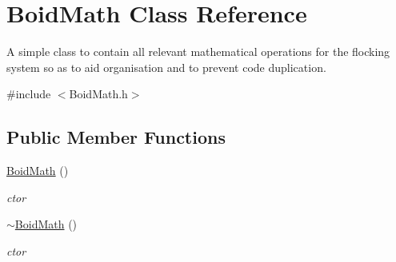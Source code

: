 \hypertarget{classBoidMath}{
\section{BoidMath Class Reference}
\label{classBoidMath}
}


A simple class to contain all relevant mathematical operations for the flocking system so as to aid organisation and to prevent code duplication.  


{\ttfamily \#include $<$BoidMath.h$>$}\subsection*{Public Member Functions}
\begin{DoxyCompactItemize}
\item 
\hyperlink{classBoidMath_a96f701b19a18f2a07372f5eb50548e99}{BoidMath} ()
\begin{DoxyCompactList}\small\item\em ctor \item\end{DoxyCompactList}\item 
\hyperlink{classBoidMath_a1b7dfa1c968c08d4ed9ba03be75d91e0}{$\sim$BoidMath} ()
\begin{DoxyCompactList}\small\item\em ctor \item\end{DoxyCompactList}\end{DoxyCompactItemize}
